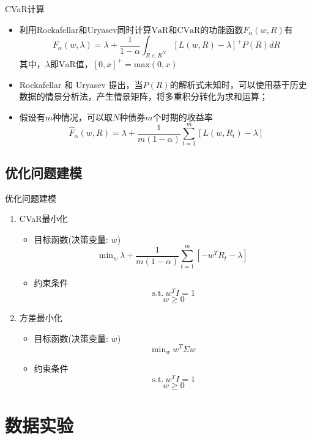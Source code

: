 \documentclass[CJK,aspectratio=43]{beamer}  %
\begin{document}
\begin{frame}{CVaR计算}
	\begin{itemize}
		\item 利用Rockafellar和Uryasev同时计算$\text{VaR}$和$\text{CVaR}$的功能函数$F_{\alpha}(w,R)$有
		$$
		F_{\alpha}(w,\lambda)=\lambda+\frac{1}{1-\alpha}\int_{R\in R^N}[L(w,R)-\lambda]^{+}P(R)dR
		$$
		其中，$\lambda$即$\text{VaR}$值，$[0,x]^+=\text{max}(0,x)$
		\item Rockafellar 和 Uryasev 提出，当$P(R)$的解析式未知时，可以使用基于历史数据的情景分析法，产生情景矩阵，将多重积分转化为求和运算；
		\item 假设有$m$种情况，可以取$N$种债券$m$个时期的收益率~\cite{Rong2007}
		$$
		\widehat{F}_{\alpha}(w,R)=\lambda+\frac{1}{m(1-\alpha)}\sum_{t=1}^{m}[L(w,R_t)-\lambda]
		$$
	\end{itemize}
\end{frame}

\subsection{优化问题建模}
\begin{frame}{优化问题建模}
	\begin{enumerate}
	\item CVaR最小化
		\begin{itemize}	
			\item 目标函数(决策变量: $w$)  \\
			$$
			\text{min}_{w} \ \lambda+\frac{1}{m(1-\alpha)}\sum_{t=1}^{m}[-w^TR_t-\lambda]
			$$
			\item 约束条件 \\
			$$
			\text{s.t.} \ w^TI=1
			$$
			$$
			w \geq 0
			$$
		\end{itemize}
	\item 方差最小化
		\begin{itemize}	
			\item 目标函数(决策变量: $w$) \\
			$$
			\text{min}_{w} \ w^T\Sigma w
			$$
			\item 约束条件 \\
			$$
			\text{s.t.} \ w^TI=1
			$$
			$$
			w \geq 0
			$$
		\end{itemize}
	\end{enumerate}
\end{frame}

\section{数据实验}
\end{document}
